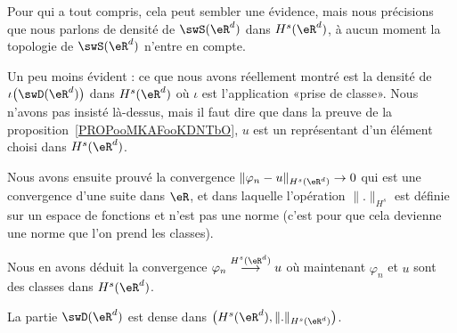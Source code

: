 \begin{remark}
	Pour qui a tout compris, cela peut sembler une évidence, mais nous précisions que nous parlons de densité de \( \swS(\eR^d)\) dans \( H^s(\eR^d)\), à aucun moment la topologie de \( \swS(\eR^d)\) n'entre en compte.

	Un peu moins évident : ce que nous avons réellement montré est la densité de \( \iota\big( \swD(\eR^d) \big)\) dans \( H^s(\eR^d)\) où \( \iota\) est l'application «prise de classe». Nous n'avons pas insisté là-dessus, mais il faut dire que dans la preuve de la proposition~\ref{PROPooMKAFooKDNTbO}, \( u\) est un représentant d'un élément choisi dans \( H^s(\eR^d)\).

	Nous avons ensuite prouvé la convergence \( \| \varphi_n-u \|_{H^s(\eR^d)}\to 0\) qui est une convergence d'une suite dans \( \eR\), et dans laquelle l'opération \( \| . \|_{H^s}\) est définie sur un espace de fonctions et n'est pas une norme (c'est pour que cela devienne une norme que l'on prend les classes).

	Nous en avons déduit la convergence \( \varphi_n\stackrel{H^s(\eR^d)}{\longrightarrow}u\) où maintenant \( \varphi_n\) et \( u\) sont des classes dans \( H^s(\eR^d)\).
\end{remark}

\begin{proposition}     \label{PROPooLIQJooKpWtnV}
	La partie \( \swD(\eR^d)\) est dense dans \( \big( H^s(\eR^d),\| . \|_{H^s(\eR^d)} \big)\).
\end{proposition}

